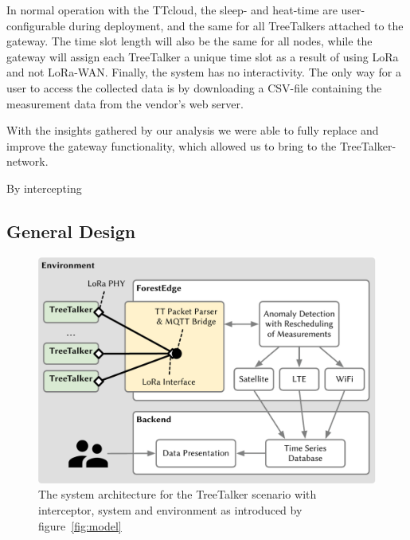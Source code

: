 In normal operation with the TTcloud, the sleep- and heat-time are user-configurable during deployment, and the same for all TreeTalkers attached to the gateway.
The time slot length will also be the same for all nodes, while the gateway will assign each TreeTalker a unique time slot as a result of using LoRa and not LoRa-WAN.
Finally, the system has no interactivity.
The only way for a user to access the collected data is by downloading a CSV-file containing the measurement data from the vendor's web server.

With the insights gathered by our analysis we were able to fully replace and improve the gateway functionality, which allowed us to bring \mm to the TreeTalker-network.

By intercepting


\subsection{General Design}
\label{sec:TreeTalker:design}

\begin{figure}
    \centering
    \includegraphics[width=\linewidth]{figures/model_TTT.pdf}
    \caption{The system architecture for the TreeTalker scenario with interceptor, system and environment as introduced by figure~\ref{fig:model}}
    \label{fig:model_TTT}
\end{figure}

